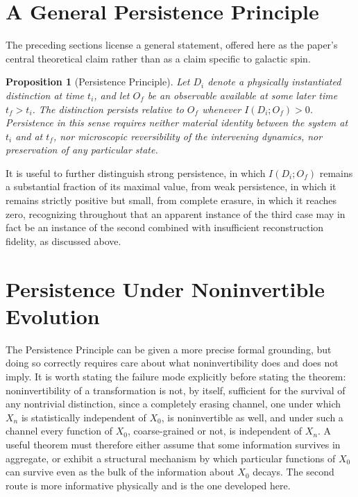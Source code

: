 \documentclass[11pt]{article}
\newtheorem{proposition}{Proposition}
\begin{document}
\section{A General Persistence Principle}

The preceding sections license a general statement, offered here as the paper's central theoretical claim rather than as a claim specific to galactic spin.

\begin{proposition}[Persistence Principle]
Let $D_i$ denote a physically instantiated distinction at time $t_i$, and let $O_f$ be an observable available at some later time $t_f > t_i$. The distinction persists relative to $O_f$ whenever $I(D_i; O_f) > 0$. Persistence in this sense requires neither material identity between the system at $t_i$ and at $t_f$, nor microscopic reversibility of the intervening dynamics, nor preservation of any particular state.
\end{proposition}

It is useful to further distinguish strong persistence, in which $I(D_i; O_f)$ remains a substantial fraction of its maximal value, from weak persistence, in which it remains strictly positive but small, from complete erasure, in which it reaches zero, recognizing throughout that an apparent instance of the third case may in fact be an instance of the second combined with insufficient reconstruction fidelity, as discussed above.

\section{Persistence Under Noninvertible Evolution}

The Persistence Principle can be given a more precise formal grounding, but doing so correctly requires care about what noninvertibility does and does not imply. It is worth stating the failure mode explicitly before stating the theorem: noninvertibility of a transformation is not, by itself, sufficient for the survival of any nontrivial distinction, since a completely erasing channel, one under which $X_n$ is statistically independent of $X_0$, is noninvertible as well, and under such a channel every function of $X_0$, coarse-grained or not, is independent of $X_n$. A useful theorem must therefore either assume that some information survives in aggregate, or exhibit a structural mechanism by which particular functions of $X_0$ can survive even as the bulk of the information about $X_0$ decays. The second route is more informative physically and is the one developed here.
\end{document}
